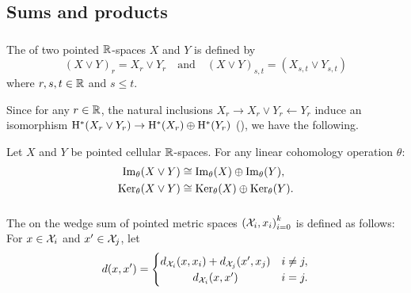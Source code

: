 
\subsection{Sums and products}\label{ss:sums_products}

\subsubsection{}

The  of two pointed $\mathbb{R}$-spaces $X$ and $Y$ is defined by
\[
(X \vee Y)_r = X_r \vee Y_r \quad\text{and}\quad (X \vee Y)_{s,t} = (X_{s,t} \vee Y_{s,t})
\]
where \(r,s,t \in \mathbb{R}\) and \(s \leq t\).

Since for any \(r \in \mathbb{R}\), the natural inclusions $X_r \to X_r \vee Y_r \leftarrow Y_r$ induce an isomorphism $\mathrm{H}^*(X_r \vee Y_r) \to \mathrm{H}^*(X_r) \oplus \mathrm{H}^*(Y_r)$ (\cite[Cor.~2.25.]{hatcher2000}), we have the following.

\medskip\lemma
Let $X$ and $Y$ be pointed cellular $\mathbb{R}$-spaces.
For any linear cohomology operation $\theta$:
\begin{align*}
	\operatorname{Im}_\theta(X \vee Y) &\cong \operatorname{Im}_\theta(X) \oplus \operatorname{Im}_\theta(Y), \\
	\operatorname{Ker}_\theta(X \vee Y) &\cong \operatorname{Ker}_\theta(X) \oplus \operatorname{Ker}_\theta(Y).
\end{align*}

%

\subsubsection{}\label{ss:wedge sum}

The  on the wedge sum of pointed metric spaces ${(\mathcal{X}_i, x_i)}_{i = 0}^k$ is defined as follows: For $x \in \mathcal{X}_i$ and $x' \in \mathcal{X}_j$, let
\[
d(x, x') =
\begin{cases}
	d_{\cX_i}(x, x_i) + d_{\cX_j}(x', x_j) & i \neq j, \\
	\hfil d_{\cX_i}(x, x') & i = j.
\end{cases}
\]

